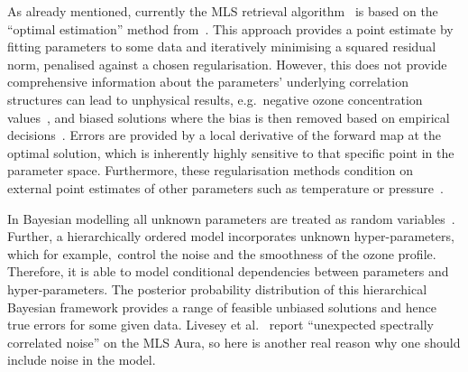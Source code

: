 As already mentioned, currently the MLS retrieval algorithm~\cite{livesey2006retrieval} is based on the ``optimal estimation'' method from~\cite{rodgers1976retrieval}.
This approach provides a point estimate by fitting parameters to some data and iteratively minimising a squared residual norm, penalised against a chosen regularisation.
However, this does not provide comprehensive information about the parameters' underlying correlation structures can lead to unphysical results, e.g.~negative ozone concentration values~\cite{MLSdata}, and biased solutions where the bias is then removed based on empirical decisions~\cite{livesey2008ozonecarbonmono, Froidevaux2008snrozone}.
Errors are provided by a local derivative of the forward map at the optimal solution, which is inherently highly sensitive to that specific point in the parameter space.
Furthermore, these regularisation methods condition on external point estimates of other parameters such as temperature or pressure~\cite{livesey2006retrieval}.

In Bayesian modelling all unknown parameters are treated as random variables~\cite{kaipio2005statinv}.
Further, a hierarchically ordered model incorporates unknown hyper-parameters, which for example,~control the noise and the smoothness of the ozone profile.
Therefore, it is able to model conditional dependencies between parameters and hyper-parameters.
The posterior probability distribution of this hierarchical Bayesian framework provides a range of feasible unbiased solutions and hence true errors for some given data.
Livesey et al.~\cite{livesey2006retrieval} report ``unexpected spectrally correlated noise'' on the MLS Aura, so here is another real reason why one should include noise in the model.

